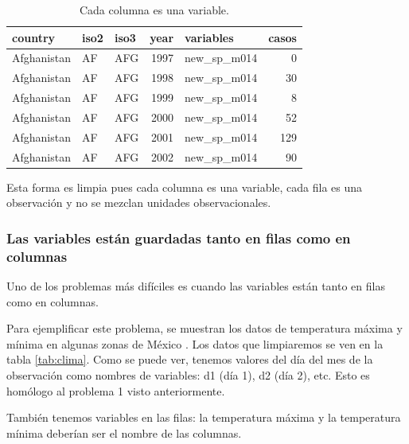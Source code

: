\documentclass[]{article}
\begin{document}
\begin{table}[ht]
\centering
\begingroup\tiny
\begin{tabular}{lllrlr}
  \hline
country & iso2 & iso3 & year & variables & casos \\ 
  \hline
Afghanistan & AF & AFG & 1997 & new\_sp\_m014 &   0 \\ 
  Afghanistan & AF & AFG & 1998 & new\_sp\_m014 &  30 \\ 
  Afghanistan & AF & AFG & 1999 & new\_sp\_m014 &   8 \\ 
  Afghanistan & AF & AFG & 2000 & new\_sp\_m014 &  52 \\ 
  Afghanistan & AF & AFG & 2001 & new\_sp\_m014 & 129 \\ 
  Afghanistan & AF & AFG & 2002 & new\_sp\_m014 &  90 \\ 
   \hline
\end{tabular}
\endgroup
\caption{Cada columna es una variable.} 
\label{tab:varslimpios}
\end{table}

\begin{nota}[Nota] 
Esta forma es limpia pues cada columna es una variable, cada fila es una observación
y no se mezclan unidades observacionales.
\end{nota}

\subsubsection{Las variables están guardadas tanto en filas como en
columnas}\label{las-variables-estan-guardadas-tanto-en-filas-como-en-columnas}

Uno de los problemas más difíciles es cuando las variables están tanto
en filas como en columnas.

Para ejemplificar este problema, se muestran los datos de temperatura
máxima y mínima en algunas zonas de México
\parencite[][archivo data/weather.txt]{tidydata}. Los datos que
limpiaremos se ven en la tabla \ref{tab:clima}. Como se puede ver,
tenemos valores del día del mes de la observación como nombres de
variables: d1 (día 1), d2 (día 2), etc. Esto es homólogo al problema 1
visto anteriormente.

También tenemos variables en las filas: la temperatura máxima y la
temperatura mínima deberían ser el nombre de las columnas.
\end{document}
